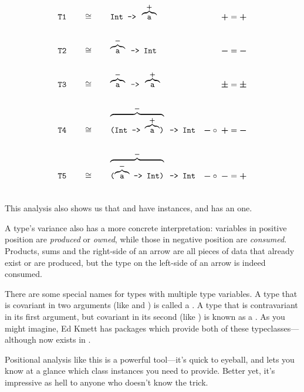 \documentclass[book.tex]{subfiles}
\begin{document}
$$
\begin{align*}
  \tyAnno{T1}{\ty{Int -> }\posp{\ty{a}}}{\possym}{\possym}
  \tyAnno{T2}{\negp{\ty{a}}\ty{ -> Int}}{\negsym}{\negsym}
  \tyAnno{T3}{\negp{\ty{a}}\ty{ -> }\posp{\ty{a}}}{\pmsym}{\pmsym}
  \tyAnno{T4}{\negp{\ty{(Int -> }\posp{\ty{a}}\ty{)}}\ty{ -> Int}}{\negsym\circ\;\possym}{\negsym}
  \tyAnno{T5}{\negp{\ty{(}\negp{\ty{a}}\ty{ -> Int)}}\ty{ -> Int}}{\negsym\circ\;\negsym}{\possym}
\end{align*}
$$

This analysis also shows us that  and  have 
instances, and  has an  one.

A type's variance also has a more concrete interpretation: variables in positive
position are \emph{produced} or \emph{owned}, while those in negative position
are \emph{consumed}. Products, sums and the right-side of an arrow are all
pieces of data that already exist or are produced, but the type on the left-side
of an arrow is indeed consumed.

There are some special names for types with multiple type variables. A type that
is covariant in two arguments (like  and \ty{(,)}) is called a
. A type that is contravariant in its first argument, but
covariant in its second (like \ty{(->)}) is known as a . As you
might imagine, Ed Kmett has packages which provide both of these
typeclasses---although  now exists in .

Positional analysis like this is a powerful tool---it's quick to eyeball, and
lets you know at a glance which class instances you need to provide. Better yet,
it's impressive as hell to anyone who doesn't know the trick.
\end{document}
